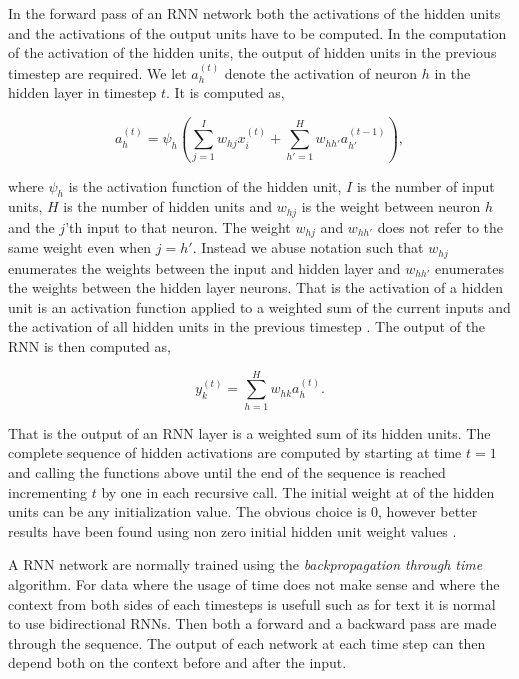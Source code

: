 \begin{description}
        In the forward pass of an \gls{RNN} network both the activations of
        the hidden units and the activations of the output units have to be
        computed. In the computation of the activation of the hidden units, the
        output of hidden units in the previous timestep are required. We let
        $a^{(t)}_h$ denote the activation of neuron $h$ in the hidden layer in
        timestep $t$. It is computed as,

        \begin{equation}
            a^{(t)}_h = \psi_h\left(
                \sum_{j=1}^I w_{hj} x^{(t)}_i +
                \sum_{h'=1}^H w_{hh'} a^{(t-1)}_{h'}
            \right),
        \end{equation}

        where $\psi_h$ is the activation function of the hidden unit, $I$ is the
        number of input units, $H$ is the number of hidden units and $w_{hj}$
        is the weight between neuron $h$ and the $j$'th input to that neuron.
        The weight $w_{hj}$ and $w_{hh'}$ does not refer to the same weight even
        when $j = h'$. Instead we abuse notation such that $w_{hj}$ enumerates
        the weights between the input and hidden layer and $w_{hh'}$ enumerates
        the weights between the hidden layer neurons. That is the activation of
        a hidden unit is an activation function applied to a weighted sum of the
        current inputs and the activation of all hidden units in the previous
        timestep \citep{DBLP:series/sci/2012-385}. The output of the \gls{RNN}
        is then computed as,

        \begin{equation}
            y^{(t)}_k = \sum_{h=1}^H w_{hk} a_{h}^{(t)}.
        \end{equation}

        That is the output of an \gls{RNN} layer is a weighted sum of its
        hidden units. The complete sequence of hidden activations are computed
        by starting at time $t=1$ and calling the functions above
        until the end of the sequence is reached incrementing $t$ by one in
        each recursive call. The initial weight at of the hidden units can be
        any initialization value. The obvious choice is 0, however better
        results have been found using non zero initial hidden unit weight values
        \citep{DBLP:series/sci/2012-385}.

        A \gls{RNN} network are normally trained using the \emph{backpropagation
        through time} algorithm. For data where the usage of time does not make
        sense and where the context from both sides of each timesteps is usefull
        such as for text it is normal to use bidirectional \glspl{RNN}. Then
        both a forward and a backward pass are made through the sequence. The
        output of each network at each time step can then depend both on the
        context before and after the input.


\end{description}
